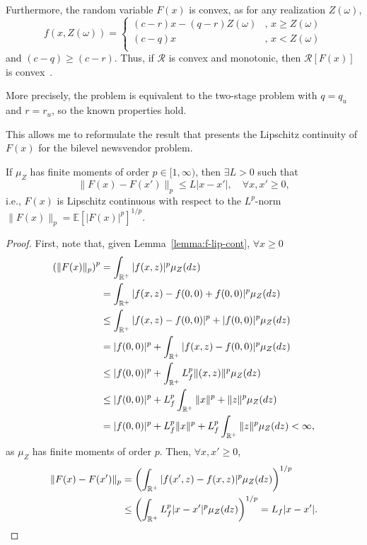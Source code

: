 \documentclass[12pt]{article}
\begin{document}
Furthermore, the random variable $F(x)$ is convex, as for any realization $Z(\omega)$, \[
    f(x,Z(\omega)) = \begin{cases}
	(c-r)x - (q-r)Z(\omega) &,\, x \ge Z(\omega) \\
	(c-q)x &,\, x < Z(\omega) \\
    \end{cases}
\] and $(c-q) \ge (c-r)$.
Thus, if $\mathcal{R}$ is convex and monotonic, then $\mathcal{R}[F(x)]$ is convex~\citep[Proposition~6.8]{shapiroLecturesStochasticProgramming2009}.

More precisely, the problem is equivalent to the two-stage problem with $q=q_u$ and $r=r_u$, so the known properties hold.



This allows me to reformulate the result that presents the Lipschitz continuity of $F(x)$ for the bilevel newsvendor problem.

\begin{lemma}[\citet{burtscheidtBilevelLinearOptimization2020}, Lemma~17.2.4\footnote{Except the case for probability measures with finite moments of order $p=\infty$.}] 
    If $\mu_Z$ has finite moments of order $p\in [1,\infty)$, then $\exists L>0$ such that \[
	\|F(x) - F(x')\|_p \le L |x - x'|,\quad \forall x,x' \ge 0
    ,\] i.e., $F(x)$ is Lipschitz continuous with respect to the $L^p$-norm $\|F(x)\|_p = \mathbb{E}[|F(x)|^{p}]^{1 / p}$.
\end{lemma}
\begin{proof}
    First, note that, given Lemma~\ref{lemma:f-lip-cont}, $\forall x \ge 0$
    \begin{align*}
	\left( \|F(x)\|_p \right)^{p} &= \int_{\mathbb{R}^+} |f(x,z)|^{p} \mu_Z(dz)  \\
	&= \int_{\mathbb{R}^+} |f(x,z) - f(0,0) + f(0,0)|^{p} \mu_Z(dz)  \\
	&\le  \int_{\mathbb{R}^+} |f(x,z) - f(0,0)|^{p} + |f(0,0)|^{p} \mu_Z(dz)  \\
	&=  |f(0,0)|^{p} + \int_{\mathbb{R}^+} |f(x,z) - f(0,0)|^{p} \mu_Z(dz) \\
	&\le |f(0,0)|^{p} + \int_{\mathbb{R}^+} L_f^{p} \|(x,z)\|^{p} \mu_Z(dz) \\
	&\le |f(0,0)|^{p} + L_f^{p} \int_{\mathbb{R}^+} \|x\|^{p} + \|z\|^{p} \mu_Z(dz) \\
	&= |f(0,0)|^{p} + L_f^{p} \|x\|^{p} + L_f^{p} \int_{\mathbb{R}^+}\|z\|^{p} \mu_Z(dz) < \infty
    ,\end{align*}
    as $\mu_Z$ has finite moments of order $p$.
    Then, $\forall x,x'\ge 0$,
    \begin{align*}
        \|F(x) - F(x')\|_{p} &= \left( \int_{\mathbb{R}^{+}} |f(x',z) - f(x,z)|^{p}\mu_Z(dz) \right)^{1 / p} \\ 
	&\le \left( \int_{\mathbb{R}^{+}} L_f^{p} |x - x'|^{p}\mu_Z(dz) \right)^{1 / p} = L_f |x-x'|
    .\end{align*}
\end{proof}





% 
\printbibliography
    
\end{document}
